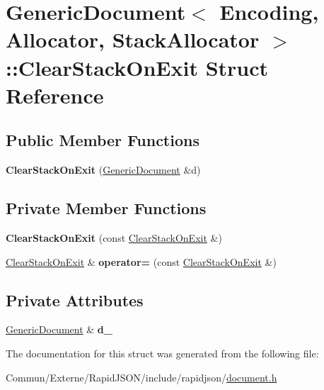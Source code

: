 \hypertarget{struct_generic_document_1_1_clear_stack_on_exit}{}\section{Generic\+Document$<$ Encoding, Allocator, Stack\+Allocator $>$\+:\+:Clear\+Stack\+On\+Exit Struct Reference}
\label{struct_generic_document_1_1_clear_stack_on_exit}
\subsection*{Public Member Functions}
\begin{DoxyCompactItemize}
\item 
{\bfseries Clear\+Stack\+On\+Exit} (\hyperlink{class_generic_document}{Generic\+Document} \&d)\hypertarget{struct_generic_document_1_1_clear_stack_on_exit_a99ba88d8b8ae15ccf5c979fff80c713a}{}\label{struct_generic_document_1_1_clear_stack_on_exit_a99ba88d8b8ae15ccf5c979fff80c713a}

\end{DoxyCompactItemize}
\subsection*{Private Member Functions}
\begin{DoxyCompactItemize}
\item 
{\bfseries Clear\+Stack\+On\+Exit} (const \hyperlink{struct_generic_document_1_1_clear_stack_on_exit}{Clear\+Stack\+On\+Exit} \&)\hypertarget{struct_generic_document_1_1_clear_stack_on_exit_ae009d5d42300fb5790227d24b4b38921}{}\label{struct_generic_document_1_1_clear_stack_on_exit_ae009d5d42300fb5790227d24b4b38921}

\item 
\hyperlink{struct_generic_document_1_1_clear_stack_on_exit}{Clear\+Stack\+On\+Exit} \& {\bfseries operator=} (const \hyperlink{struct_generic_document_1_1_clear_stack_on_exit}{Clear\+Stack\+On\+Exit} \&)\hypertarget{struct_generic_document_1_1_clear_stack_on_exit_a474a254254f2deaba8c98ea79dc9c0f1}{}\label{struct_generic_document_1_1_clear_stack_on_exit_a474a254254f2deaba8c98ea79dc9c0f1}

\end{DoxyCompactItemize}
\subsection*{Private Attributes}
\begin{DoxyCompactItemize}
\item 
\hyperlink{class_generic_document}{Generic\+Document} \& {\bfseries d\+\_\+}\hypertarget{struct_generic_document_1_1_clear_stack_on_exit_a56c2e82730f07911288b42640b029dc3}{}\label{struct_generic_document_1_1_clear_stack_on_exit_a56c2e82730f07911288b42640b029dc3}

\end{DoxyCompactItemize}


The documentation for this struct was generated from the following file\+:\begin{DoxyCompactItemize}
\item 
Commun/\+Externe/\+Rapid\+J\+S\+O\+N/include/rapidjson/\hyperlink{document_8h}{document.\+h}\end{DoxyCompactItemize}
